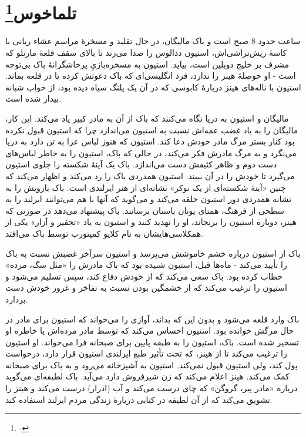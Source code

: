 \documentclass[12pt]{book}
\begin{document}
    \chapter[تلماخوس]{تلماخوس\protect\footnote{-}}\label{ep:1}
    ساعت حدود 8 صبح است و باک مالیگان، در حال تقلید و مسخرۀ مراسم عشاء ربانی با کاسۀ ریش‌تراشی‌اش، استیون ددالوس را صدا می‌زند تا بالای سقف قلعۀ مارتلو که مشرف بر خلیج دوبلین است، بیاید.  استیون به مسخره‌بازیِ پرخاشگرانۀ باک بی‌توجه است - او حوصلۀ هینز را ندارد، فرد انگلیسی‌ای که باک دعوتش کرده تا در قلعه بماند. استیون با ناله‌های هینز دربارۀ کابوسی که در آن یک پلنگ سیاه دیده بود، از خواب شبانه بیدار شده است.

    مالیگان و استیون به دریا نگاه می‌کنند که باک از آن به مادر کبیر یاد می‌کند. این کار، مالیگان را به یاد غضب عمه‌اش نسبت به استیون می‌اندازد چرا که استیون قبول نکرده بود کنار بستر مرگ مادر خودش دعا کند. استیون که هنوز لباس عزا به تن دارد به دریا می‌نگرد و به مرگ مادرش فکر می‌کند، در حالی که باک، استیون را به خاطر لباس‌‌های دست دوم و ظاهر کثیفش دست می‌اندازد. باک یک آینۀ شکسته را جلوی استیون می‌گیرد تا خودش را در آن ببیند. استیون همدردی باک را رد می‌کند و اظهار می‌کند که چنین «آینۀ شکسته‌ای از یک نوکر» نشانه‌ای از هنر ایرلندی است. باک بازویش را به نشانه همدردی دور استیون حلقه می‌کند و می‌گوید که آنها با هم می‌توانند ایرلند را به سطحی از فرهنگ، همتای یونان باستان برسانند. باک پیشنهاد می‌دهد در صورتی که هینز، دوباره استیون را برنجاند، او را تهدید کنند و استیون به یاد «تحقیر و آزار» یکی از همکلاسی‌هایشان به نام کلایو کمپتورپ توسط باک می‌افتد.

    باک از استیون درباره خشم خاموشش می‌پرسد و استیون سرآخر غضبش نسبت به باک را تأیید می‌کند - ماه‌ها قبل، استیون شنیده بود که باک مادرش را «مثل سگ، مرده» خطاب کرده بود. باک سعی می‌کند که از خودش دفاع کند، سپس تسلیم می‌شود و استیون را ترغیب می‌کند که از خشمگین بودن نسبت به تفاخر و غرور خودش دست بردارد.

    باک وارد قلعه می‌شود و بدون این که بداند، آوازی را می‌خواند که استیون برای مادر در حال مرگش خوانده بود. استیون احساس می‌کند که توسط مادر مرده‌اش یا خاطره او تسخیر شده است. باک، استیون را به طبقه پایین برای صبحانه فرا می‌خواند. او استیون را ترغیب می‌کند تا از هینز، که تحت تأثیر طبع ایرلندی استیون قرار دارد، درخواست پول کند، ولی استیون قبول نمی‌کند. استیون به آشپزخانه می‌رود و به باک برای صبحانه کمک می‌کند. هینز اعلام می‌کند که زن شیرفروش دارد می‌آید. باک لطیفه‌ای می‌گوید درباره «مادر پیر، گروگن» که چای درست می‌کند و آب (ادرار) درست می‌کند و هینز را تشویق می‌کند که از آن لطیفه در کتابی دربارۀ زندگی مردم ایرلند استفاده کند.
\end{document}
